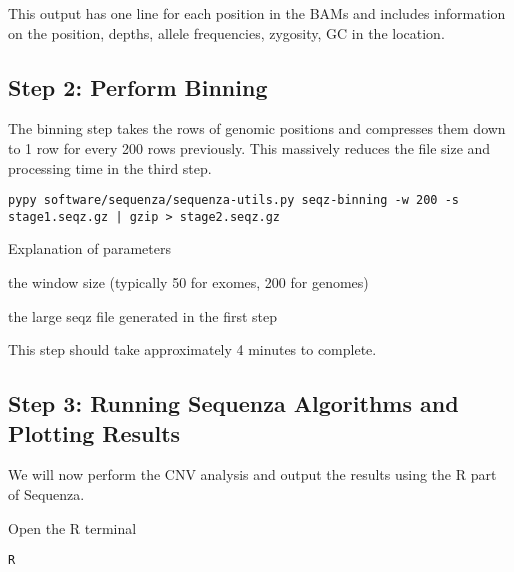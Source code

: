 This output has one line for each position in the BAMs and includes information on the position, depths, allele frequencies, zygosity, GC in the location. 


\subsection{Step 2: Perform Binning}

The binning step takes the rows of genomic positions and compresses them down to 1 row for every 200 rows previously. This massively reduces the file size and processing time in the third step.

\begin{steps}
\begin{lstlisting}
pypy software/sequenza/sequenza-utils.py seqz-binning -w 200 -s stage1.seqz.gz | gzip > stage2.seqz.gz
\end{lstlisting}
\end{steps}

\begin{note}
Explanation of parameters
\begin{description}[style=multiline,labelindent=0cm,align=right,leftmargin=\descriptionlabelspace,rightmargin=1.5cm,font=\ttfamily]
 \item[-w] the window size (typically 50 for exomes, 200 for genomes)
 \item[-s] the large seqz file generated in the first step
\end{description}
\end{note}

This step should take approximately 4 minutes to complete.


\subsection{Step 3: Running Sequenza Algorithms and Plotting Results}

We will now perform the CNV analysis and output the results using the R part of Sequenza.

\begin{steps}
Open the R terminal
\begin{lstlisting}
R
\end{lstlisting}
\end{steps}

